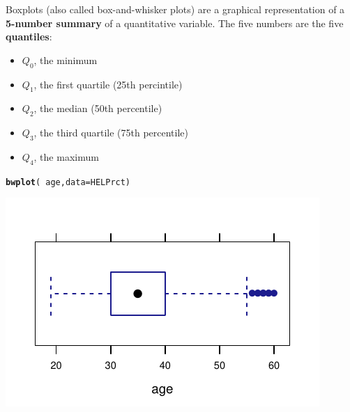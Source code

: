 \documentclass[twoside]{book}\usepackage[]{graphicx}\usepackage[]{xcolor}
\makeatletter
\def\maxwidth{ %
  \ifdim\Gin@nat@width>\linewidth
    \linewidth
  \else
    \Gin@nat@width
  \fi
}
\newcommand{\hlopt}[1]{\textcolor[rgb]{0,0,0}{#1}}%
\newcommand{\hlstd}[1]{\textcolor[rgb]{0.345,0.345,0.345}{#1}}%
\newcommand{\hlkwc}[1]{\textcolor[rgb]{0.333,0.667,0.333}{#1}}%
\newcommand{\hlkwd}[1]{\textcolor[rgb]{0.737,0.353,0.396}{\textbf{#1}}}%
\newenvironment{kframe}{%
 \def\at@end@of@kframe{}%
 \ifinner\ifhmode%
  \def\at@end@of@kframe{\end{minipage}}%
  \begin{minipage}{\columnwidth}%
 \fi\fi%
 \def\FrameCommand##1{\hskip\@totalleftmargin \hskip-\fboxsep
 \colorbox{shadecolor}{##1}\hskip-\fboxsep
     \hskip-\linewidth \hskip-\@totalleftmargin \hskip\columnwidth}%
 \MakeFramed {\advance\hsize-\width
   \@totalleftmargin\z@ \linewidth\hsize
   \@setminipage}}%
 {\par\unskip\endMakeFramed%
 \at@end@of@kframe}
\newenvironment{knitrout}{}{} %
\def\term#1{\textbf{#1}}
\makeatother
\begin{document}
Boxplots (also called box-and-whisker plots) are a graphical representation of a 
\term{5-number summary} of a quantitative variable.  The five numbers are
the five \term{quantiles}:
\begin{itemize}
	\item $Q_0$, the minimum
	\item $Q_1$, the first quartile (25th percintile) 
	\item $Q_2$, the median (50th percentile)
	\item $Q_3$, the third quartile (75th percentile)
	\item $Q_4$, the maximum
\end{itemize}
\begin{knitrout}
\color{fgcolor}\begin{kframe}
\begin{alltt}
\hlkwd{bwplot}\hlstd{(}\hlopt{~}\hlstd{age,} \hlkwc{data} \hlstd{= HELPrct)}
\end{alltt}
\end{kframe}

{\centering \includegraphics[width=\maxwidth]{figures/fig-bwplot-1} 

}



\end{knitrout}
\end{document}
